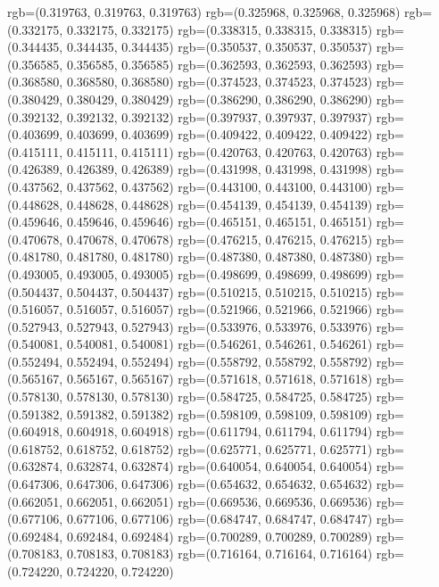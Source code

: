 {{{					rgb=(0.319763, 0.319763, 0.319763)
					rgb=(0.325968, 0.325968, 0.325968)
					rgb=(0.332175, 0.332175, 0.332175)
					rgb=(0.338315, 0.338315, 0.338315)
					rgb=(0.344435, 0.344435, 0.344435)
					rgb=(0.350537, 0.350537, 0.350537)
					rgb=(0.356585, 0.356585, 0.356585)
					rgb=(0.362593, 0.362593, 0.362593)
					rgb=(0.368580, 0.368580, 0.368580)
					rgb=(0.374523, 0.374523, 0.374523)
					rgb=(0.380429, 0.380429, 0.380429)
					rgb=(0.386290, 0.386290, 0.386290)
					rgb=(0.392132, 0.392132, 0.392132)
					rgb=(0.397937, 0.397937, 0.397937)
					rgb=(0.403699, 0.403699, 0.403699)
					rgb=(0.409422, 0.409422, 0.409422)
					rgb=(0.415111, 0.415111, 0.415111)
					rgb=(0.420763, 0.420763, 0.420763)
					rgb=(0.426389, 0.426389, 0.426389)
					rgb=(0.431998, 0.431998, 0.431998)
					rgb=(0.437562, 0.437562, 0.437562)
					rgb=(0.443100, 0.443100, 0.443100)
					rgb=(0.448628, 0.448628, 0.448628)
					rgb=(0.454139, 0.454139, 0.454139)
					rgb=(0.459646, 0.459646, 0.459646)
					rgb=(0.465151, 0.465151, 0.465151)
					rgb=(0.470678, 0.470678, 0.470678)
					rgb=(0.476215, 0.476215, 0.476215)
					rgb=(0.481780, 0.481780, 0.481780)
					rgb=(0.487380, 0.487380, 0.487380)
					rgb=(0.493005, 0.493005, 0.493005)
					rgb=(0.498699, 0.498699, 0.498699)
					rgb=(0.504437, 0.504437, 0.504437)
					rgb=(0.510215, 0.510215, 0.510215)
					rgb=(0.516057, 0.516057, 0.516057)
					rgb=(0.521966, 0.521966, 0.521966)
					rgb=(0.527943, 0.527943, 0.527943)
					rgb=(0.533976, 0.533976, 0.533976)
					rgb=(0.540081, 0.540081, 0.540081)
					rgb=(0.546261, 0.546261, 0.546261)
					rgb=(0.552494, 0.552494, 0.552494)
					rgb=(0.558792, 0.558792, 0.558792)
					rgb=(0.565167, 0.565167, 0.565167)
					rgb=(0.571618, 0.571618, 0.571618)
					rgb=(0.578130, 0.578130, 0.578130)
					rgb=(0.584725, 0.584725, 0.584725)
					rgb=(0.591382, 0.591382, 0.591382)
					rgb=(0.598109, 0.598109, 0.598109)
					rgb=(0.604918, 0.604918, 0.604918)
					rgb=(0.611794, 0.611794, 0.611794)
					rgb=(0.618752, 0.618752, 0.618752)
					rgb=(0.625771, 0.625771, 0.625771)
					rgb=(0.632874, 0.632874, 0.632874)
					rgb=(0.640054, 0.640054, 0.640054)
					rgb=(0.647306, 0.647306, 0.647306)
					rgb=(0.654632, 0.654632, 0.654632)
					rgb=(0.662051, 0.662051, 0.662051)
					rgb=(0.669536, 0.669536, 0.669536)
					rgb=(0.677106, 0.677106, 0.677106)
					rgb=(0.684747, 0.684747, 0.684747)
					rgb=(0.692484, 0.692484, 0.692484)
					rgb=(0.700289, 0.700289, 0.700289)
					rgb=(0.708183, 0.708183, 0.708183)
					rgb=(0.716164, 0.716164, 0.716164)
					rgb=(0.724220, 0.724220, 0.724220)
}}}
